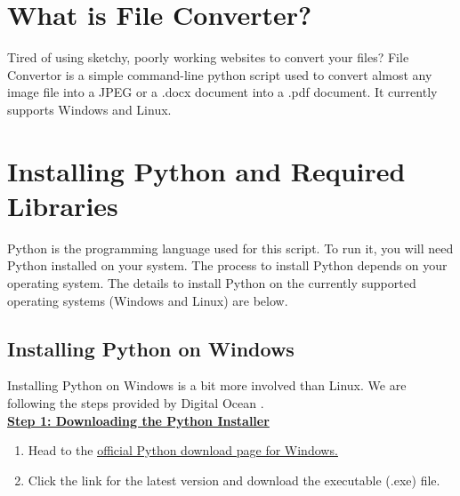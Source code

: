 \documentclass[
	a4paper, %
	12pt, %
]{CSSullivanBusinessReport}
\begin{document}
\newpage

\begin{fullwidth}
\section{What is File Converter?}
Tired of using sketchy, poorly working websites to convert your files? File Convertor is a simple command-line python script used to convert almost any image file into a JPEG or a .docx document into a .pdf document. It currently supports Windows and Linux. 
\section{Installing Python and Required Libraries} %

Python is the programming language used for this script. To run it, you  will need Python installed on your system. The process to install Python depends on your operating system. The details to install Python on the currently supported operating systems (Windows and Linux) are below.

\subsection{Installing Python on Windows}
Installing Python on Windows is a bit more involved than Linux. We are following the steps provided by Digital Ocean \cite{Gangwar2023Feb}.\\ 

\textbf{\underline{Step 1:  Downloading the Python Installer}}\\
\begin{enumerate}
\item Head to the \href{https://www.python.org/downloads/windows/}{\underline{official Python download page for Windows. }}
\item Click the link for the latest version and download the executable (.exe) file.
\end{enumerate}


\end{fullwidth}
\end{document}
